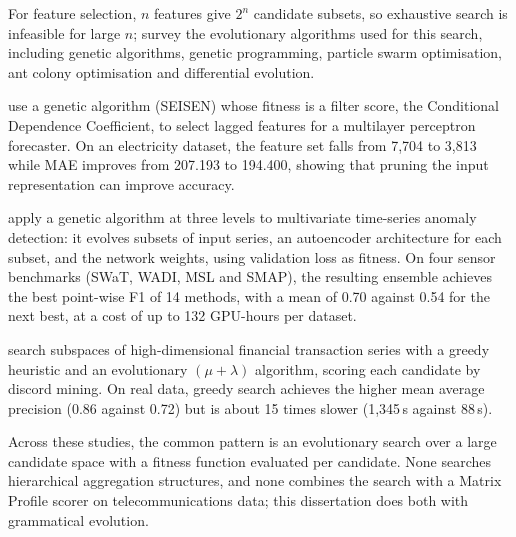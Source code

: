 For feature selection, $n$ features give $2^n$ candidate subsets, so exhaustive search is infeasible for large $n$; \textcite{xue2016survey} survey the evolutionary algorithms used for this search, including genetic algorithms, genetic programming, particle swarm optimisation, ant colony optimisation and differential evolution.

\textcite{linares2024evolutionary} use a genetic algorithm (SEISEN) whose fitness is a filter score, the Conditional Dependence Coefficient, to select lagged features for a multilayer perceptron forecaster.
On an electricity dataset, the feature set falls from 7{,}704 to 3{,}813 while \ac{MAE} improves from 207.193 to 194.400, showing that pruning the input representation can improve accuracy.

\textcite{pietron2025adnev} apply a genetic algorithm at three levels to multivariate time-series anomaly detection: it evolves subsets of input series, an autoencoder architecture for each subset, and the network weights, using validation loss as fitness.
On four sensor benchmarks (SWaT, WADI, MSL and SMAP), the resulting ensemble achieves the best point-wise F1 of 14 methods, with a mean of 0.70 against 0.54 for the next best, at a cost of up to 132 GPU-hours per dataset.

\textcite{he2021mining} search subspaces of high-dimensional financial transaction series with a greedy heuristic and an evolutionary $(\mu+\lambda)$ algorithm, scoring each candidate by discord mining.
On real data, greedy search achieves the higher mean average precision (0.86 against 0.72) but is about 15 times slower (1{,}345\,s against 88\,s).

Across these studies, the common pattern is an evolutionary search over a large candidate space with a fitness function evaluated per candidate.
None searches hierarchical aggregation structures, and none combines the search with a Matrix Profile scorer on telecommunications data; this dissertation does both with grammatical evolution.
